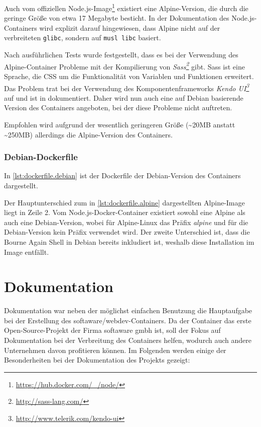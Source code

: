 Auch vom offiziellen Node.js-Image\footnote{\url{https://hub.docker.com/_/node/}} existiert eine Alpine-Version, die durch die geringe Größe von etwa 17 Megabyte besticht.
In der Dokumentation des Node.js-Containers wird explizit darauf hingewiesen, dass Alpine nicht auf der verbreiteten \verb|glibc|, sondern auf \verb|musl libc| basiert.

Nach ausführlichen Tests wurde festgestellt, dass es bei der Verwendung des Alpine-Container Probleme mit der Kompilierung von \emph{Sass\footnote{\url{http://sass-lang.com/}}} gibt.
Sass ist eine Sprache, die CSS um die Funktionalität von Variablen und Funktionen erweitert.
Das Problem trat bei der Verwendung des Komponentenframeworks \emph{Kendo UI\footnote{\url{http://www.telerik.com/kendo-ui}}} auf und ist in \autocite{Simko.sass-segfault:online} dokumentiert.
Daher wird nun auch eine auf Debian basierende Version des Containers angeboten, bei der diese Probleme nicht auftreten.

Empfohlen wird aufgrund der wesentlich geringeren Größe (\textasciitilde{}20MB anstatt \textasciitilde{}250MB) allerdings die Alpine-Version des Containers.

\subsubsection{Debian-Dockerfile}

In \cref{lst:dockerfile.debian} ist der Dockerfile der Debian-Version des Containers dargestellt.

Der Hauptunterschied zum in \cref{lst:dockerfile.alpine} dargestellten Alpine-Image liegt in Zeile 2.
Vom Node.js-Docker-Container existiert sowohl eine Alpine als auch eine Debian-Version, wobei für Alpine-Linux das Präfix \emph{alpine} und für die Debian-Version kein Präfix verwendet wird.
Der zweite Unterschied ist, dass die Bourne Again Shell in Debian bereits inkludiert ist, weshalb diese Installation im Image entfällt.



\section{Dokumentation}
\label{sec:documentation}
Dokumentation war neben der möglichst einfachen Benutzung die Hauptaufgabe bei der Erstellung des softaware/webdev-Containers.
Da der Container das erste Open-Source-Projekt der Firma softaware gmbh ist, soll der Fokus auf Dokumentation bei der Verbreitung des Containers helfen, wodurch auch andere Unternehmen davon profitieren können.
Im Folgenden werden einige der Besonderheiten bei der Dokumentation des Projekts gezeigt:

